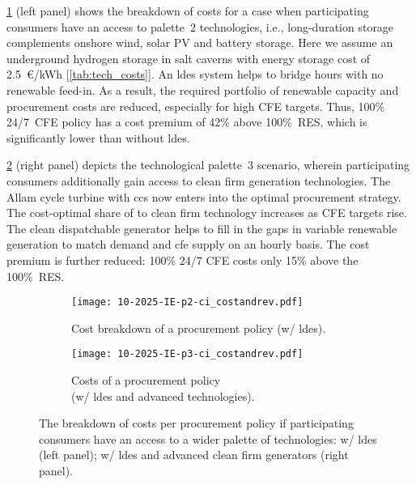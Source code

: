 \documentclass[11pt, 5p, nopreprintline]{elsarticle}
\begin{document}
\cref{fig:10-2025-IE-p2-ci_costandrev} (left panel) shows the breakdown of costs for a case when participating consumers have an access to palette~2 technologies, i.e., long-duration storage complements onshore wind, solar PV and battery storage.
Here we assume an underground hydrogen storage in salt caverns with energy storage cost of 2.5~\euro/kWh [\cref{tab:tech_costs}].
An \gls{ldes} system helps to bridge hours with no renewable feed-in.
As a result, the required portfolio of renewable capacity and procurement costs are reduced, especially for high CFE targets.
Thus, 100\% 24/7~CFE policy has a cost premium of 42\% above 100\%~RES, which is significantly lower than without \gls{ldes}.

\cref{fig:10-2025-IE-p3-ci_costandrev} (right panel) depicts the technological palette~3 scenario, wherein participating consumers additionally gain access to clean firm generation technologies.
The Allam cycle turbine with \gls{ccs} now enters into the optimal procurement strategy.
The cost-optimal share of to clean firm technology increases as CFE targets rise.
The clean dispatchable generator helps to fill in the gaps in variable renewable generation to match demand and \gls{cfe} supply on an hourly basis.
The cost premium is further reduced: 100\% 24/7 CFE costs only 15\% above the 100\%~RES.

\begin{figure*}
    \centering
    \begin{subfigure}{0.5\textwidth}
        \centering
        \caption{Cost breakdown of a procurement policy (w/ \gls{ldes}).}
        \texttt{[image: 10-2025-IE-p2-ci\_costandrev.pdf]}
        \label{fig:10-2025-IE-p2-ci_costandrev}
    \end{subfigure}%
    \begin{subfigure}{0.5\textwidth}
        \centering
        \caption{Costs of a procurement policy \\
        (w/ \gls{ldes} and advanced technologies).}
        \texttt{[image: 10-2025-IE-p3-ci\_costandrev.pdf]}
        \label{fig:10-2025-IE-p3-ci_costandrev}
    \end{subfigure}
    \caption{The breakdown of costs per procurement policy if participating consumers have an access to a wider palette of technologies: w/ \gls{ldes} (left panel); w/ \gls{ldes} and advanced clean firm generators (right panel).
    }
    \label{fig:10-2025-IE-p23-ci_procurement}
\end{figure*}
\end{document}
